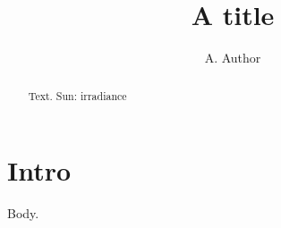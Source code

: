 \begin{opening}
\title{A title}
\author{A. Author}
\end{opening}

\begin{abstract}
Text.
\keywords Sun: irradiance
\end{abstract}
\section{Intro}
Body.

